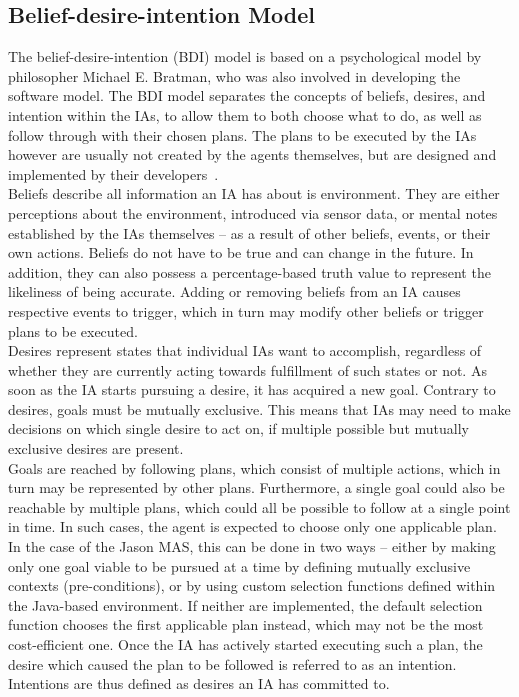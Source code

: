\documentclass[draft,final]{vutinfth} %
\begin{document}
\subsection{Belief-desire-intention Model}
\label{chap:bdi}

The belief-desire-intention (BDI) model is based on a psychological model by philosopher Michael E. Bratman, who was also involved in developing the software model. 
The BDI model separates the concepts of beliefs, desires, and intention within the IAs, to allow them to both choose what to do, as well as follow through with their chosen plans. 
The plans to be executed by the IAs however are usually not created by the agents themselves, but are designed and implemented by their developers~\cite{rao1996agentspeak}. \\
Beliefs describe all information an IA has about is environment. 
They are either perceptions about the environment, introduced via sensor data, or mental notes established by the IAs themselves – as a result of other beliefs, events, or their own actions. 
Beliefs do not have to be true and can change in the future. 
In addition, they can also possess a percentage-based truth value to represent the likeliness of being accurate. 
Adding or removing beliefs from an IA causes respective events to trigger, which in turn may modify other beliefs or trigger plans to be executed. \\
Desires represent states that individual IAs want to accomplish, regardless of whether they are currently acting towards fulfillment of such states or not. 
As soon as the IA starts pursuing a desire, it has acquired a new goal. 
Contrary to desires, goals must be mutually exclusive. 
This means that IAs may need to make decisions on which single desire to act on, if multiple possible but mutually exclusive desires are present. \\
Goals are reached by following plans, which consist of multiple actions, which in turn may be represented by other plans. 
Furthermore, a single goal could also be reachable by multiple plans, which could all be possible to follow at a single point in time. 
In such cases, the agent is expected to choose only one applicable plan. 
In the case of the Jason MAS, this can be done in two ways – either by making only one goal viable to be pursued at a time by defining mutually exclusive contexts (pre-conditions), or by using custom selection functions defined within the Java-based environment. 
If neither are implemented, the default selection function chooses the first applicable plan instead, which may not be the most cost-efficient one. 
Once the IA has actively started executing such a plan, the desire which caused the plan to be followed is referred to as an intention. Intentions are thus defined as desires an IA has committed to.  
\end{document}
